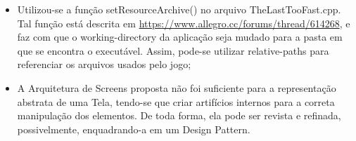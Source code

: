 \documentclass[a4paper]{article}
\begin{document}
\begin{itemize}
\item {\color{black}
Utilizou-se a função setResourceArchive() no arquivo TheLastTooFast.cpp.
Tal função está descrita em
\href{https://www.allegro.cc/forums/thread/614268}{https}\href{https://www.allegro.cc/forums/thread/614268}{://}\href{https://www.allegro.cc/forums/thread/614268}{www}\href{https://www.allegro.cc/forums/thread/614268}{.}\href{https://www.allegro.cc/forums/thread/614268}{allegro}\href{https://www.allegro.cc/forums/thread/614268}{.}\href{https://www.allegro.cc/forums/thread/614268}{cc}\href{https://www.allegro.cc/forums/thread/614268}{/}\href{https://www.allegro.cc/forums/thread/614268}{forums}\href{https://www.allegro.cc/forums/thread/614268}{/}\href{https://www.allegro.cc/forums/thread/614268}{thread}\href{https://www.allegro.cc/forums/thread/614268}{/614268},
e faz com que o working-directory da aplicação seja mudado para a pasta
em que se encontra o executável. Assim, pode-se utilizar relative-paths
para referenciar os arquivos usados pelo jogo;}
\item {\color{black}
A Arquitetura de Screens proposta não foi suficiente para a
representação abstrata de uma Tela, tendo-se que criar artifícios
internos para a correta manipulação dos elementos. De toda forma, ela
pode ser revista e refinada, possivelmente, enquadrando-a em um Design
Pattern.}
\end{itemize}

\bigskip
\end{document}
